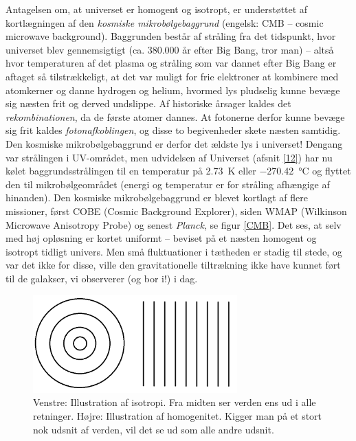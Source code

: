 Antagelsen om, at universet er homogent og isotropt, er understøttet af
kortlægningen af den \emph{kosmiske mikrobølgebaggrund} (engelsk: CMB – cosmic microwave
background). Baggrunden består af stråling fra det tidspunkt, hvor universet blev
gennemsigtigt (ca. 380.000 år efter Big Bang, tror man) – altså hvor temperaturen af det plasma
og stråling som var dannet efter Big Bang er aftaget så tilstrækkeligt, at det var muligt for frie elektroner at 
kombinere med atomkerner og danne hydrogen og helium,
hvormed lys pludselig kunne bevæge sig næsten frit og derved undslippe. Af historiske årsager kaldes det \emph{rekombinationen}, da de første atomer dannes. At fotonerne derfor kunne bevæge sig frit kaldes \emph{fotonafkoblingen}, og disse to begivenheder skete næsten samtidig. Den kosmiske mikrobølgebaggrund er derfor det ældste
lys i universet! Dengang var strålingen i UV-området, men udvidelsen af Universet
(afsnit \ref{12}) har nu kølet baggrundsstrålingen til en temperatur på \SI{2.73}{\kelvin} eller \SI{-270.42}{\degreeCelsius} og flyttet den til mikrobølgeområdet (energi og temperatur er for stråling afhængige af hinanden). Den kosmiske mikrobølgebaggrund er blevet kortlagt af flere
missioner, først COBE (Cosmic Background Explorer), siden WMAP (Wilkinson
Microwave Anisotropy Probe) og senest \textit{Planck}, se figur \ref{CMB}. Det ses, at selv med høj opløsning er kortet uniformt – beviset på et næsten
homogent og isotropt tidligt univers. Men små fluktuationer i tætheden er stadig til
stede, og var det ikke for disse, ville den gravitationelle tiltrækning ikke have kunnet
ført til de galakser, vi observerer (og bor i!) i dag.

\begin{figure}[]
	\centering
	\includegraphics[width=0.7\textwidth]{Kosmo/2017/img/isohomo.png}
	\caption{Venstre: Illustration af isotropi. Fra midten ser verden ens ud i alle retninger. Højre: Illustration af homogenitet. Kigger man på et stort nok udsnit af verden, vil det se ud som alle andre udsnit.}
	\label{isohomo}
\end{figure}

